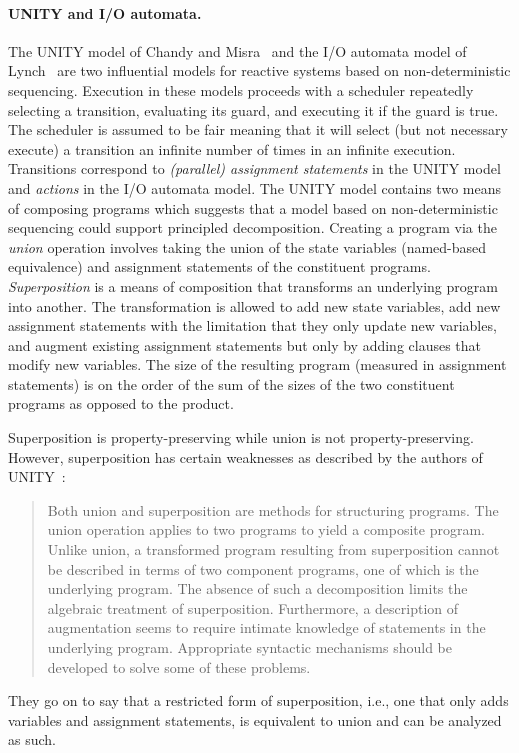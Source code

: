 \paragraph{UNITY and I/O automata.}
The UNITY model of Chandy and Misra~\cite{chandy1989parallel} and the I/O automata model of Lynch~\cite{nancy1996distributed} are two influential models for reactive systems based on non-deterministic sequencing.
Execution in these models proceeds with a scheduler repeatedly selecting a transition, evaluating its guard, and executing it if the guard is true.
The scheduler is assumed to be fair meaning that it will select (but not necessary execute) a transition an infinite number of times in an infinite execution.
Transitions correspond to \emph{(parallel) assignment statements} in the UNITY model and \emph{actions} in the I/O automata model.
The UNITY model contains two means of composing programs which suggests that a model based on non-deterministic sequencing could support principled decomposition.
Creating a program via the \emph{union} operation involves taking the union of the state variables (named-based equivalence) and assignment statements of the constituent programs.
\emph{Superposition} is a means of composition that transforms an underlying program into another.
The transformation is allowed to add new state variables, add new assignment statements with the limitation that they only update new variables, and augment existing assignment statements but only by adding clauses that modify new variables.
The size of the resulting program (measured in assignment statements) is on the order of the sum of the sizes of the two constituent programs as opposed to the product.

Superposition is property-preserving while union is not property-preserving.
However, superposition has certain weaknesses as described by the authors of UNITY~\cite{chandy1989parallel}:
\begin{quotation}
Both union and superposition are methods for structuring programs.
The union operation applies to two programs to yield a composite program.
Unlike union, a transformed program resulting from superposition cannot be described in terms of two component programs, one of which is the underlying program.
The absence of such a decomposition limits the algebraic treatment of superposition.
Furthermore, a description of augmentation seems to require intimate knowledge of statements in the underlying program.
Appropriate syntactic mechanisms should be developed to solve some of these problems.
\end{quotation}
They go on to say that a restricted form of superposition, i.e., one that only adds variables and assignment statements, is equivalent to union and can be analyzed as such.

